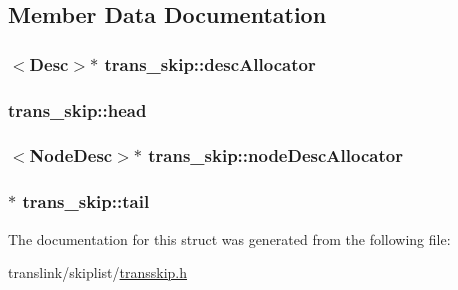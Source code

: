 \subsection{Member Data Documentation}
\hypertarget{structtrans__skip_a7bd5096f4e55a68c1a236daa3fa41404}{
\subsubsection[{desc\-Allocator}]{$<${\bf Desc}$>$$\ast$ trans\-\_\-skip\-::desc\-Allocator}}\label{structtrans__skip_a7bd5096f4e55a68c1a236daa3fa41404}
\hypertarget{structtrans__skip_af0d0d3b556f1dd198c3a7c55410e51f0}{
\subsubsection[{head}]{ trans\-\_\-skip\-::head}}\label{structtrans__skip_af0d0d3b556f1dd198c3a7c55410e51f0}
\hypertarget{structtrans__skip_ac7306fc6b2482c73b573af62357490c3}{
\subsubsection[{node\-Desc\-Allocator}]{$<${\bf Node\-Desc}$>$$\ast$ trans\-\_\-skip\-::node\-Desc\-Allocator}}\label{structtrans__skip_ac7306fc6b2482c73b573af62357490c3}
\hypertarget{structtrans__skip_a8b83e966c26cafbacb33d797167e823b}{
\subsubsection[{tail}]{$\ast$ trans\-\_\-skip\-::tail}}\label{structtrans__skip_a8b83e966c26cafbacb33d797167e823b}


The documentation for this struct was generated from the following file\-:\begin{DoxyCompactItemize}
\item 
translink/skiplist/\hyperlink{transskip_8h}{transskip.\-h}\end{DoxyCompactItemize}
